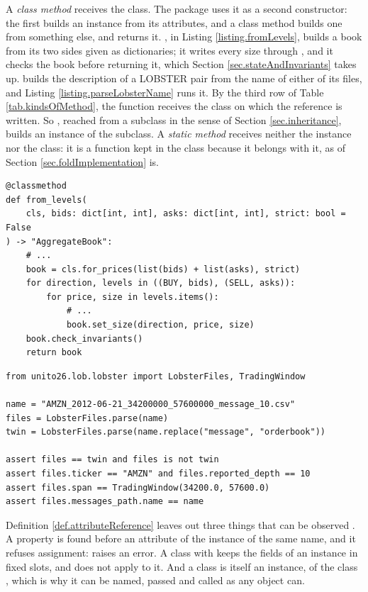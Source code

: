 A \emph{class method} receives the class.
The package uses it as a second constructor:
the first builds an instance from its attributes,
and a class method builds one from something else, and returns it.
, in Listing \ref{listing.fromLevels},
builds a book from its two sides given as dictionaries;
it writes every size through ,
and it checks the book before returning it,
which Section \ref{sec.stateAndInvariants} takes up.
 builds the description of a LOBSTER pair
from the name of either of its files,
and Listing \ref{listing.parseLobsterName} runs it.
By the third row of Table \ref{tab.kindsOfMethod},
the function receives the class on which the reference is written.
So , reached from a subclass in the sense of Section \ref{sec.inheritance},
builds an instance of the subclass.
A \emph{static method} receives neither the instance nor the class:
it is a function kept in the class because it belongs with it,
as  of Section \ref{sec.foldImplementation} is.

\begin{lstlisting}[caption={\protect\codehl{unito26.lob.orderbook.AggregateBook.from\_levels}, abridged.}, label=listing.fromLevels]
@classmethod
def from_levels(
    cls, bids: dict[int, int], asks: dict[int, int], strict: bool = False
) -> "AggregateBook":
    # ...
    book = cls.for_prices(list(bids) + list(asks), strict)
    for direction, levels in ((BUY, bids), (SELL, asks)):
        for price, size in levels.items():
            # ...
            book.set_size(direction, price, size)
    book.check_invariants()
    return book
\end{lstlisting}

\begin{lstlisting}[caption={A second constructor: a LOBSTER pair from the name of a file.}, label=listing.parseLobsterName]
from unito26.lob.lobster import LobsterFiles, TradingWindow

name = "AMZN_2012-06-21_34200000_57600000_message_10.csv"
files = LobsterFiles.parse(name)
twin = LobsterFiles.parse(name.replace("message", "orderbook"))

assert files == twin and files is not twin
assert files.ticker == "AMZN" and files.reported_depth == 10
assert files.span == TradingWindow(34200.0, 57600.0)
assert files.messages_path.name == name
\end{lstlisting}

\begin{remark}\label{remark.completeRule}
 Definition \ref{def.attributeReference} leaves out three things that can be observed
 \citep[Section 3.3]{PSF26lan}.
 A property is found before an attribute of the instance of the same name,
 and it refuses assignment:  raises an error.
 A class with  keeps the fields of an instance in fixed slots,
 and  does not apply to it.
 And a class is itself an instance, of the class ,
 which is why it can be named, passed and called as any object can.
\end{remark}

